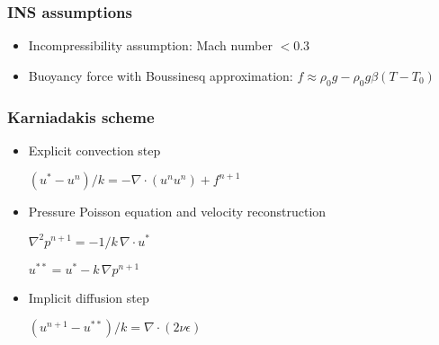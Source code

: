 \begin{frame}
\frametitle{INS assumptions}

\begin{itemize}
  \item Incompressibility assumption: Mach number $< 0.3$
  \item Buoyancy force with Boussinesq approximation: $f \approx \rho_0 g - \rho_0 g \beta (T-T_0)$
\end{itemize}
\end{frame}





\begin{frame}
\frametitle{Karniadakis scheme}

\begin{itemize}
  \item Explicit convection step
  
    $(u^* - u^n)/k = - \nabla \cdot (u^nu^n) + f^{n+1}$
  \item Pressure Poisson equation and velocity reconstruction
  
    $\nabla^2 p^{n+1} = - 1/k \, \nabla \cdot u^*$
    
    $u^{**} = u^* - k \, \nabla p^{n+1}$
  \item Implicit diffusion step
  
    $ (u^{n+1} - u^{**})/k = \nabla \cdot (2\nu\epsilon) $
\end{itemize}
\end{frame}